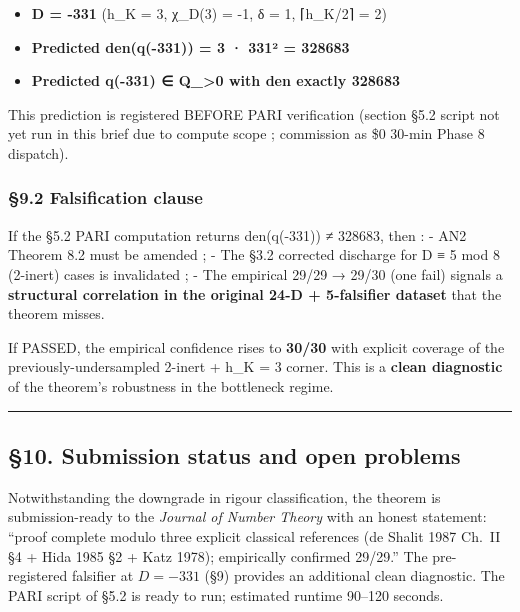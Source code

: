 \documentclass[
  11pt,
  a4paper,
]{article}
\providecommand{\tightlist}{\setlength{\itemsep}{0pt}\setlength{\parskip}{0pt}}
\providecommand{\tightlist}{%
  \setlength{\itemsep}{0pt}\setlength{\parskip}{0pt}}
\begin{document}
\begin{itemize}
\tightlist
\item
  \textbf{D = -331} (h\_K = 3, χ\_D(3) = -1, δ = 1, ⌈h\_K/2⌉ = 2)
\item
  \textbf{Predicted den(q(-331)) = 3 · 331² = 328683}
\item
  \textbf{Predicted q(-331) ∈ Q\_\textgreater0 with den exactly 328683}
\end{itemize}

This prediction is registered BEFORE PARI verification (section §5.2 script not yet run in this brief due to compute scope ; commission as \$0 30-min Phase 8 dispatch).

\hypertarget{falsification-clause}{%
\subsubsection{§9.2 Falsification clause}\label{falsification-clause}}

If the §5.2 PARI computation returns den(q(-331)) ≠ 328683, then :
- AN2 Theorem 8.2 must be amended ;
- The §3.2 corrected discharge for D ≡ 5 mod 8 (2-inert) cases is invalidated ;
- The empirical 29/29 → 29/30 (one fail) signals a \textbf{structural correlation in the original 24-D + 5-falsifier dataset} that the theorem misses.

If PASSED, the empirical confidence rises to \textbf{30/30} with explicit coverage of the previously-undersampled 2-inert + h\_K = 3 corner. This is a \textbf{clean diagnostic} of the theorem's robustness in the bottleneck regime.

\begin{center}\rule{0.5\linewidth}{0.5pt}\end{center}

\hypertarget{submission-status}{%
\subsection{§10. Submission status and open problems}\label{submission-status}}

Notwithstanding the downgrade in rigour classification, the theorem is submission-ready to the \emph{Journal of Number Theory} with an honest statement: ``proof complete modulo three explicit classical references (de Shalit 1987 Ch.\ II §4 + Hida 1985 §2 + Katz 1978); empirically confirmed 29/29.'' The pre-registered falsifier at $D = -331$ (§9) provides an additional clean diagnostic. The PARI script of §5.2 is ready to run; estimated runtime 90--120 seconds.
\end{document}
